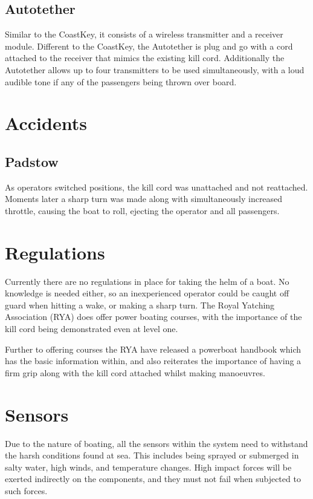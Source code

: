 \documentclass[10pt]{ecsprogressreport}
\begin{document}
\subsection{Autotether\cite{}}

Similar to the CoastKey, it consists of a wireless transmitter and a receiver module. Different to the CoastKey, the Autotether is plug and go with a cord attached to the receiver that mimics the existing kill cord. Additionally the Autotether allows up to four transmitters to be used simultaneously, with a loud audible tone if any of the passengers being thrown over board. 

\section{Accidents}

\subsection{Padstow\cite{}}
As operators switched positions, the kill cord was unattached and not reattached. Moments later a sharp turn was made along with simultaneously increased throttle, causing the boat to roll, ejecting the operator and all passengers.  


\section{Regulations}

Currently there are no regulations in place for taking the helm of a boat. No knowledge is needed either, so an inexperienced operator could be caught off guard when hitting a wake, or making a sharp turn. The Royal Yatching Association (RYA) does offer power boating courses, with the importance of the kill cord being demonstrated even at level one\cite{ryasyl}. 

Further to offering courses the RYA have released a powerboat handbook which has the basic information within, and also reiterates the importance of having a firm grip along with the kill cord attached whilst making manoeuvres.

\section{Sensors}

Due to the nature of boating, all the sensors within the system need to withstand the harsh conditions found at sea. This includes being sprayed or submerged in salty water, high winds, and temperature changes. High impact forces will be exerted indirectly on the components, and they must not fail when subjected to such forces.
\end{document}
